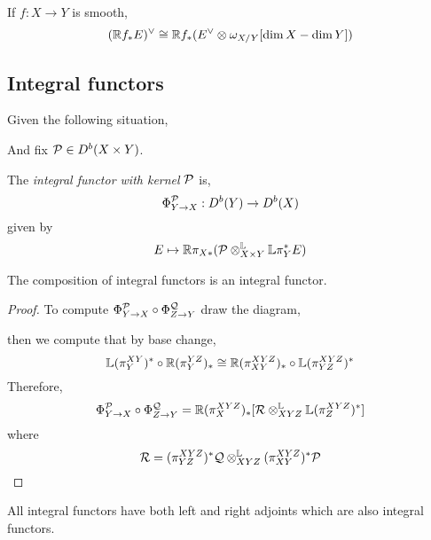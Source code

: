 \documentclass[12pt]{article}
\begin{document}
\begin{prop}
If $f : X \to Y$ is smooth,
\[ (\mathbb{R} f_* E)^\vee \cong \mathbb{R} f_* (E^\vee \otimes \omega_{X/Y}[\dim{X} - \dim{Y}]) \]
\end{prop}

\subsection{Integral functors}

Given the following situation,
\begin{center}
\end{center}
And fix $\mathcal{P} \in D^b(X \times Y)$.

\begin{defn}
The \textit{integral functor with kernel} $\mathcal{P}$ is,
\[ \Phi^{\mathcal{P}}_{Y \to X} : D^b(Y) \to D^b(X) \]
given by
\[ E \mapsto \mathbb{R} \pi_{X*} (\mathcal{P} \otimes^{\mathbb{L}}_{X \times Y} \mathbb{L} \pi_Y^* E) \] 
\end{defn}

\begin{prop}
The composition of integral functors is an integral functor. 
\end{prop}


\newcommand{\cQ}{\mathcal{Q}}

\begin{proof}
To compute $\Phi_{Y \to X}^{\cP} \circ \Phi_{Z \to Y}^{\cQ}$ draw the diagram,
\begin{center}
\end{center}
then we compute that by base change,
\[ \mathbb{L} (\pi^{XY}_Y)^* \circ \mathbb{R} (\pi^{YZ}_Y)_* \cong \mathbb{R} (\pi^{XYZ}_{XY})_* \circ \mathbb{L} (\pi^{XYZ}_{YZ})^* \]
Therefore,
\[ \Phi_{Y \to X}^{\cP} \circ \Phi_{Z \to Y}^{\cQ} = \RR (\pi_X^{XYZ})_* [ \mathcal{R} \ot^{\LL}_{XYZ} \LL (\pi^{XYZ}_Z)^*] \]
where
\[ \mathcal{R} = (\pi^{XYZ}_{YZ})^* \cQ \ot^{\LL}_{XYZ} (\pi^{XYZ}_{XY})^* \cP \]
\end{proof}

\begin{prop}
All integral functors have both left and right adjoints which are also integral functors.
\end{prop}
\end{document}
